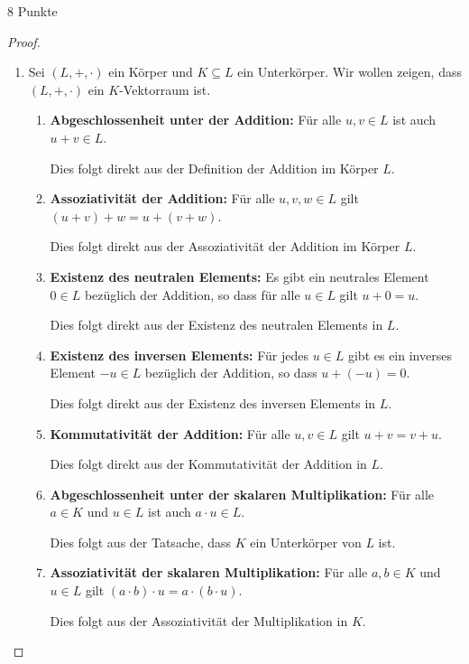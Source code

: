 \documentclass{problemset}
\begin{document}
\begin{problem}{8 Punkte}
\begin{proof}
	\begin{enumerate}
		\item Sei $(L, +, \cdot)$ ein Körper und $K \subseteq L$ ein Unterkörper. Wir wollen zeigen, dass $(L, +, \cdot)$ ein $K$-Vektorraum ist.

		      \begin{enumerate}
			      \item \textbf{Abgeschlossenheit unter der Addition:} Für alle $u, v \in L$ ist auch $u + v \in L$.

			            Dies folgt direkt aus der Definition der Addition im Körper $L$.

			      \item \textbf{Assoziativität der Addition:} Für alle $u, v, w \in L$ gilt $(u + v) + w = u + (v + w)$.

			            Dies folgt direkt aus der Assoziativität der Addition im Körper $L$.

			      \item \textbf{Existenz des neutralen Elements:} Es gibt ein neutrales Element $0 \in L$ bezüglich der Addition, so dass für alle $u \in L$ gilt $u + 0 = u$.

			            Dies folgt direkt aus der Existenz des neutralen Elements in $L$.

			      \item \textbf{Existenz des inversen Elements:} Für jedes $u \in L$ gibt es ein inverses Element $-u \in L$ bezüglich der Addition, so dass $u + (-u) = 0$.

			            Dies folgt direkt aus der Existenz des inversen Elements in $L$.

			      \item \textbf{Kommutativität der Addition:} Für alle $u, v \in L$ gilt $u + v = v + u$.

			            Dies folgt direkt aus der Kommutativität der Addition in $L$.

			      \item \textbf{Abgeschlossenheit unter der skalaren Multiplikation:} Für alle $a \in K$ und $u \in L$ ist auch $a \cdot u \in L$.

			            Dies folgt aus der Tatsache, dass $K$ ein Unterkörper von $L$ ist.

			      \item \textbf{Assoziativität der skalaren Multiplikation:} Für alle $a, b \in K$ und $u \in L$ gilt $(a \cdot b) \cdot u = a \cdot (b \cdot u)$.

			            Dies folgt aus der Assoziativität der Multiplikation in $K$.


\end{enumerate}
\end{enumerate}
\end{proof}
\end{problem}
\end{document}
